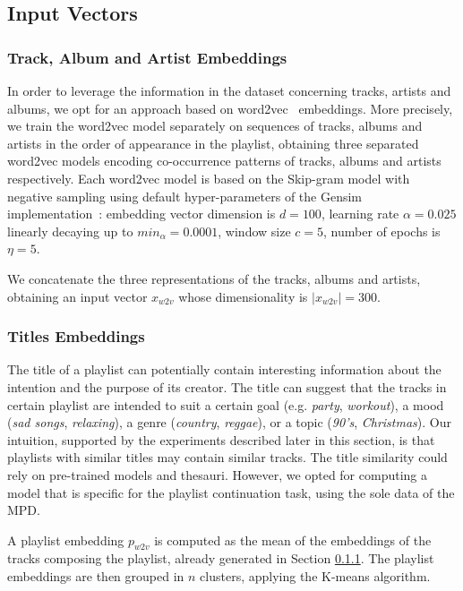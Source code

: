 \subsection{Input Vectors}

\subsubsection{Track, Album and Artist Embeddings}
\label{sec:track_embs}
In order to leverage the information in the dataset concerning tracks, artists and albums, we opt for an approach based on word2vec~\cite{mikolov2013distributed} embeddings. More precisely, we train the word2vec model separately on sequences of tracks, albums and artists in the order of appearance in the playlist, obtaining three separated word2vec models encoding co-occurrence patterns of tracks, albums and artists respectively. Each word2vec model is based on the Skip-gram model with negative sampling using default hyper-parameters of the Gensim implementation~\cite{rehurek_lrec}: embedding vector dimension is $d=100$, learning rate $\alpha = 0.025$ linearly decaying up to $min_{\alpha} = 0.0001$, window size $c = 5$, number of epochs is $\eta = 5$.

We concatenate the three representations of the tracks, albums and artists, obtaining an input vector $x_{w2v}$ whose dimensionality is $|x_{w2v}| = 300$.

\subsubsection{Titles Embeddings}
\label{sec:title_embs}
The title of a playlist can potentially contain interesting information about the intention and the purpose of its creator. The title can suggest that the tracks in certain playlist are intended to suit a certain goal (e.g. \textit{party}, \textit{workout}), a mood (\textit{sad songs}, \textit{relaxing}), a genre (\textit{country}, \textit{reggae}), or a topic (\textit{90's}, \textit{Christmas}). Our intuition, supported by the experiments described later in this section, is that playlists with similar titles may contain similar tracks.
The title similarity could rely on pre-trained models and thesauri. However, we opted for computing a model that is specific for the playlist continuation task, using the sole data of the MPD.

A playlist embedding $p_{w2v}$ is computed as the mean of the embeddings of the tracks composing the playlist, already generated in Section \ref{sec:track_embs}. The playlist embeddings are then grouped in $n$ clusters, applying the K-means algorithm.

